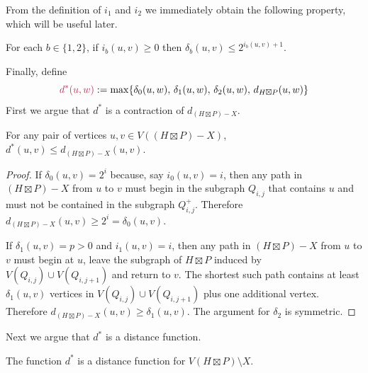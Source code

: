 \documentclass{patmorin}
\makeatletter
\renewcommand{\ge}{\geqslant}
\renewcommand{\le}{\leqslant}
\def\mathcolor#1#{\@mathcolor{#1}}
\def\@mathcolor#1#2#3{%
  \protect\leavevmode
  \begingroup
    \color#1{#2}#3%
  \endgroup
}
\newcommand{\mathdefin}[1]{\mathcolor{brightmaroon}{#1}}
\makeatother
\begin{document}
From the definition of $i_1$ and $i_2$ we immediately obtain the following property, which will be useful later.

\begin{obs}\label{i_bounds}
  For each $b\in\{1,2\}$, if
  $i_b(u,v)\ge 0$ then $\delta_b(u,v)\le 2^{i_b(u,v)+1}$.
\end{obs}

Finally, define
\[
  \mathdefin{d^*(u,w)} := \max\{\delta_0(u,w),\, \delta_1(u,w),\, \delta_2(u,w),\, d_{H\boxtimes P}(u,w) \}
\]
First we argue that $d^*$ is a contraction of $d_{(H\boxtimes P)-X}$.
\begin{lem}\label{d_star_contraction}
  For any pair of vertices $u,v\in V((H\boxtimes P)-X)$, $d^*(u,v)\le d_{(H\boxtimes P)-X}(u,v)$.
\end{lem}

\begin{proof}
  If $\delta_0(u,v)=2^i$ because, say $i_0(u,v)=i$, then any path in $(H\boxtimes P)-X$ from $u$ to $v$ must begin in the subgraph $Q_{i,j}$ that contains $u$ and must not be contained in the subgraph $Q^+_{i,j}$.  Therefore $d_{(H\boxtimes P)-X}(u,v) \ge 2^i=\delta_0(u,v)$.

  If $\delta_1(u,v)=p>0$ and $i_1(u,v)=i$, then any path in $(H\boxtimes P)-X$ from $u$ to $v$ must begin at $u$, leave the subgraph of $H\boxtimes P$ induced by $V(Q_{i,j})\cup V(Q_{i,j+1})$ and return to $v$.  The shortest such path contains at least $\delta_1(u,v)$ vertices in $V(Q_{i,j})\cup V(Q_{i,j+1})$ plus one additional vertex.  Therefore $d_{(H\boxtimes P)-X}(u,v) \ge \delta_1(u,v)$.  The argument for $\delta_2$ is symmetric.
\end{proof}

Next we argue that $d^*$ is a distance function.

\begin{lem}\label{d_star_metric}
  The function $d^*$ is a distance function for $V(H\boxtimes P)\setminus X$.
\end{lem}
\end{document}
